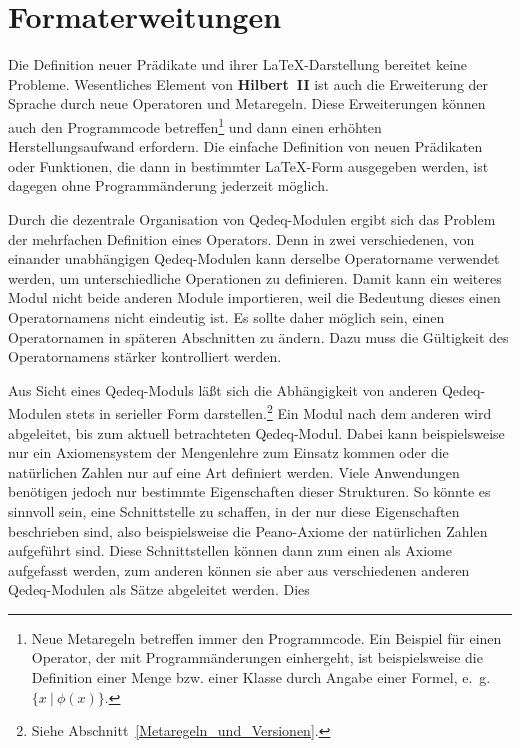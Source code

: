 \documentclass[a4paper,german,10pt,twoside]{book}
\begin{document}
{\section{Formaterweitungen}
Die Definition neuer Pr{\"a}dikate und ihrer \LaTeX{}-Darstellung bereitet keine Probleme. Wesentliches
Element von \textbf{Hilbert~II} ist auch die Erweiterung der Sprache durch neue Operatoren und
Metaregeln. Diese Erweiterungen k{\"o}nnen auch den Programmcode betreffen\footnote{Neue Metaregeln
betreffen immer den Programmcode. Ein Beispiel f{\"u}r einen Operator, der mit Programm{\"a}nderungen
einhergeht, ist beispielsweise die Definition einer Menge bzw. einer Klasse durch Angabe einer
Formel, e.~g. $\{ x~|~\phi(x) \}$.} und dann einen erh{\"o}hten Herstellungsaufwand erfordern. Die
einfache Definition von neuen Pr{\"a}dikaten oder Funktionen, die dann in bestimmter \LaTeX{}-Form
ausgegeben werden, ist dagegen ohne Programm{\"a}nderung jederzeit m{\"o}glich.
\par
Durch die dezentrale Organisation von Qedeq-Modulen ergibt sich das Problem der
mehrfachen Definition eines Operators. Denn in zwei
verschiedenen, von einander unabh{\"a}ngigen Qedeq-Modulen kann derselbe Operatorname verwendet werden,
um unterschiedliche Operationen zu definieren. Damit kann ein weiteres Modul nicht beide anderen
Module importieren, weil die Bedeutung dieses einen Operatornamens nicht eindeutig ist. Es sollte
daher m{\"o}glich sein, einen Operatornamen in sp{\"a}teren Abschnitten zu {\"a}ndern. Dazu muss die G{\"u}ltigkeit
des Operatornamens st{\"a}rker kontrolliert werden.
\par
Aus Sicht eines Qedeq-Moduls l{\"a}{\ss}t sich die Abh{\"a}ngigkeit von anderen Qedeq-Modulen stets in
serieller Form darstellen.\footnote{Siehe Abschnitt~\ref{Metaregeln_und_Versionen}.} Ein Modul nach
dem anderen wird abgeleitet, bis zum aktuell betrachteten Qedeq-Modul. Dabei kann beispielsweise
nur ein Axiomensystem der Mengenlehre zum Einsatz kommen oder die nat{\"u}rlichen Zahlen nur auf eine
Art definiert werden. Viele Anwendungen ben{\"o}tigen jedoch nur bestimmte Eigenschaften dieser
Strukturen. So k{\"o}nnte es sinnvoll sein, eine Schnittstelle zu schaffen, in der nur diese
Eigenschaften beschrieben sind, also beispielsweise die Peano-Axiome der nat{\"u}rlichen Zahlen
aufgef{\"u}hrt sind. Diese Schnittstellen k{\"o}nnen dann zum einen als Axiome aufgefasst werden, zum
anderen k{\"o}nnen sie aber aus verschiedenen anderen Qedeq-Modulen als S{\"a}tze abgeleitet werden. Dies
}
\end{document}

